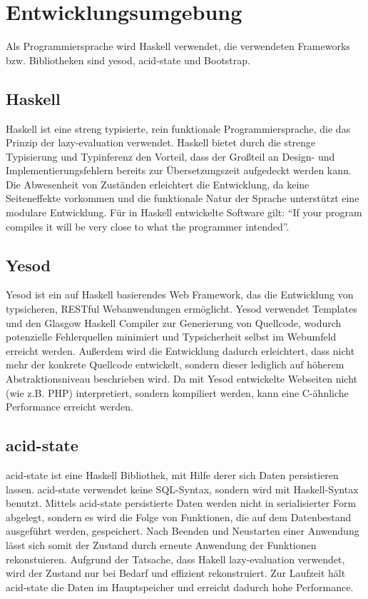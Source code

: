 \chapter{Entwicklungsumgebung}
Als Programmiersprache wird Haskell verwendet, die verwendeten Frameworks bzw. Bibliotheken sind yesod, acid-state und Bootstrap.

\section{Haskell}
Haskell \cite{Has} ist eine streng typisierte, rein funktionale Programmiersprache, die das Prinzip der  lazy-evaluation verwendet. Haskell bie\-tet durch die strenge Typisierung und Typinferenz den Vorteil, dass der Großteil an Design- und Implementierungsfehlern bereits zur Übersetzungszeit aufgedeckt werden kann. Die Abwesenheit von Zuständen erleichtert die Entwicklung, da keine Seiteneffekte vorkommen und die funktionale Natur der Sprache unterstützt eine modulare Entwicklung. Für in Haskell entwickelte Software gilt: \enquote{If your program compiles it will be very close to what the programmer intended}.

\section{Yesod}
Yesod \cite{Yes} ist ein auf Haskell basierendes Web Framework, das die Entwicklung von typsicheren, RESTful Webanwendungen   ermöglicht. Yesod verwendet Templates und den Glasgow Haskell Compiler \cite{ghc} zur Generierung von Quellcode, wodurch potenzielle Fehlerquellen minimiert und Typsicherheit selbst im Webumfeld erreicht werden. Außerdem wird die Entwicklung dadurch erleichtert, dass nicht mehr der konkrete Quellcode entwickelt, sondern dieser lediglich auf höherem Abstraktionsniveau be\-schrie\-ben wird. Da mit Yesod entwickelte Webseiten nicht (wie z.B. PHP) interpretiert, sondern kompiliert werden, kann eine C-ähnliche Performance erreicht werden.

\section{acid-state}
acid-state \cite{acid}  ist eine Haskell Bibliothek, mit Hilfe derer sich Daten persistieren  lassen. acid-state verwendet keine SQL-Syntax, sondern wird mit Haskell-Syntax benutzt. Mittels acid-state persistierte Daten werden nicht in serialisierter Form abgelegt, sondern es wird die Folge von Funktionen, die auf dem Datenbestand ausgeführt werden, gespeichert. Nach Beenden und Neustarten einer Anwendung lässt sich somit der Zustand durch erneute Anwendung der Funktionen rekonstuieren. Aufgrund der Tatsache, dass Hakell  lazy-evaluation verwendet, wird der Zustand nur bei Bedarf und effizient rekonstruiert. Zur Laufzeit hält acid-state die Daten im Hauptspeicher und erreicht dadurch hohe Performance.

